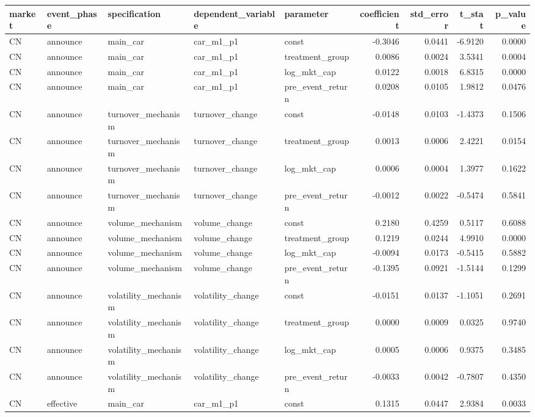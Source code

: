 \begin{tabular}{lllllrrrr}
\toprule
market & event_phase & specification & dependent_variable & parameter & coefficient & std_error & t_stat & p_value \\
\midrule
CN & announce & main_car & car_m1_p1 & const & -0.3046 & 0.0441 & -6.9120 & 0.0000 \\
CN & announce & main_car & car_m1_p1 & treatment_group & 0.0086 & 0.0024 & 3.5341 & 0.0004 \\
CN & announce & main_car & car_m1_p1 & log_mkt_cap & 0.0122 & 0.0018 & 6.8315 & 0.0000 \\
CN & announce & main_car & car_m1_p1 & pre_event_return & 0.0208 & 0.0105 & 1.9812 & 0.0476 \\
CN & announce & turnover_mechanism & turnover_change & const & -0.0148 & 0.0103 & -1.4373 & 0.1506 \\
CN & announce & turnover_mechanism & turnover_change & treatment_group & 0.0013 & 0.0006 & 2.4221 & 0.0154 \\
CN & announce & turnover_mechanism & turnover_change & log_mkt_cap & 0.0006 & 0.0004 & 1.3977 & 0.1622 \\
CN & announce & turnover_mechanism & turnover_change & pre_event_return & -0.0012 & 0.0022 & -0.5474 & 0.5841 \\
CN & announce & volume_mechanism & volume_change & const & 0.2180 & 0.4259 & 0.5117 & 0.6088 \\
CN & announce & volume_mechanism & volume_change & treatment_group & 0.1219 & 0.0244 & 4.9910 & 0.0000 \\
CN & announce & volume_mechanism & volume_change & log_mkt_cap & -0.0094 & 0.0173 & -0.5415 & 0.5882 \\
CN & announce & volume_mechanism & volume_change & pre_event_return & -0.1395 & 0.0921 & -1.5144 & 0.1299 \\
CN & announce & volatility_mechanism & volatility_change & const & -0.0151 & 0.0137 & -1.1051 & 0.2691 \\
CN & announce & volatility_mechanism & volatility_change & treatment_group & 0.0000 & 0.0009 & 0.0325 & 0.9740 \\
CN & announce & volatility_mechanism & volatility_change & log_mkt_cap & 0.0005 & 0.0006 & 0.9375 & 0.3485 \\
CN & announce & volatility_mechanism & volatility_change & pre_event_return & -0.0033 & 0.0042 & -0.7807 & 0.4350 \\
CN & effective & main_car & car_m1_p1 & const & 0.1315 & 0.0447 & 2.9384 & 0.0033 \\

\end{tabular}
